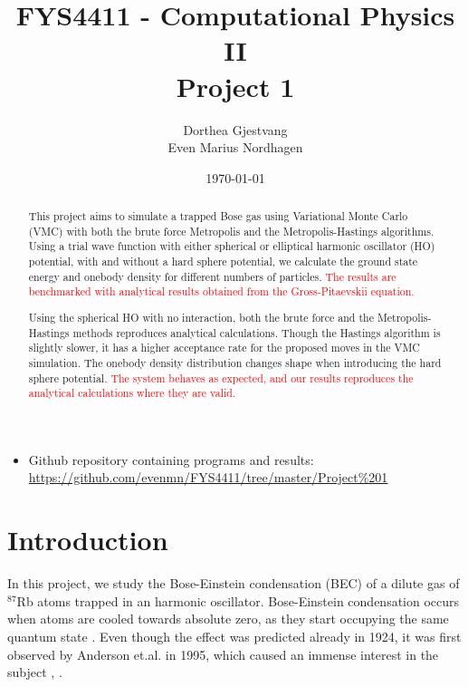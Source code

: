 \documentclass[norsk,a4paper,12pt]{article}
\title{FYS4411 - Computational Physics II\\\vspace{2mm} \Large{Project 1}}
\author{\large Dorthea Gjestvang\\ Even Marius Nordhagen}
\date\today
\begin{document}
\maketitle

\begin{itemize}
\item Github repository containing programs and results: \\\url{https://github.com/evenmn/FYS4411/tree/master/Project%201}
\end{itemize}

\begin{abstract}
This project aims to simulate a trapped Bose gas using Variational Monte Carlo (VMC) with both the  brute force Metropolis and the Metropolis-Hastings algorithms. Using a trial wave function with either spherical or elliptical harmonic oscillator (HO) potential, with and without a hard sphere potential, we calculate the ground state energy and onebody density for different numbers of particles. \textcolor{red}{The results are benchmarked with analytical results obtained from the Gross-Pitaevskii equation.} \par 

Using the spherical HO with no interaction, both the brute force and the Metropolis-Hastings methods reproduces analytical calculations. Though the Hastings algorithm is slightly slower, it has a higher acceptance rate for the proposed moves in the VMC simulation. The onebody density distribution changes shape when introducing the hard sphere potential. \textcolor{red}{The system behaves as expected, and our results reproduces the analytical calculations where they are valid.}
\par 

\end{abstract}

\newpage

\section{Introduction}

In this project, we study the Bose-Einstein condensation (BEC) of a dilute gas of $^{87}$Rb atoms trapped in an harmonic oscillator. Bose-Einstein condensation occurs when atoms are cooled towards absolute zero, as they start occupying the same quantum state \cite{JE2016}. Even though the effect was predicted already in 1924, it was first observed by Anderson et.al. in 1995, which caused an immense interest in the subject \cite{SP}, \cite{Anderson}.
\end{document}

